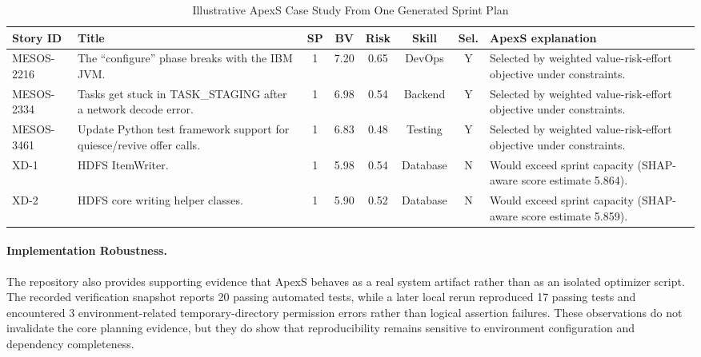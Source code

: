\documentclass[conference]{IEEEtran}
\begin{document}
\begin{table}[t]
\caption{Illustrative ApexS Case Study From One Generated Sprint Plan}
\label{tab:case-study}
\centering\scriptsize
\begin{tabularx}{\textwidth}{l>{\raggedright\arraybackslash}p{2.5in}cccccY}
\toprule
Story ID & Title & SP & BV & Risk & Skill & Sel. & ApexS explanation \\
\midrule
MESOS-2216 & The ``configure'' phase breaks with the IBM JVM. & 1 & 7.20 & 0.65 & DevOps & Y & Selected by weighted value-risk-effort objective under constraints. \\
MESOS-2334 & Tasks get stuck in TASK\_STAGING after a network decode error. & 1 & 6.98 & 0.54 & Backend & Y & Selected by weighted value-risk-effort objective under constraints. \\
MESOS-3461 & Update Python test framework support for quiesce/revive offer calls. & 1 & 6.83 & 0.48 & Testing & Y & Selected by weighted value-risk-effort objective under constraints. \\
XD-1 & HDFS ItemWriter. & 1 & 5.98 & 0.54 & Database & N & Would exceed sprint capacity (SHAP-aware score estimate 5.864). \\
XD-2 & HDFS core writing helper classes. & 1 & 5.90 & 0.52 & Database & N & Would exceed sprint capacity (SHAP-aware score estimate 5.859). \\
\bottomrule
\end{tabularx}
\end{table}

\paragraph{Implementation Robustness.}
The repository also provides supporting evidence that ApexS behaves as a real
system artifact rather than as an isolated optimizer script.
The recorded verification snapshot reports 20 passing automated tests, while a
later local rerun reproduced 17 passing tests and encountered 3
environment-related temporary-directory permission errors rather than logical
assertion failures.
These observations do not invalidate the core planning evidence, but they do show
that reproducibility remains sensitive to environment configuration and dependency
completeness.
\end{document}
